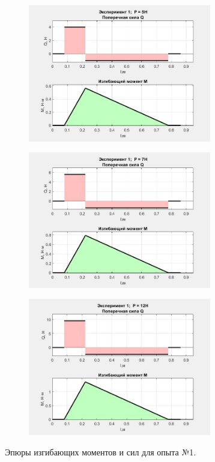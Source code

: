 \documentclass[12pt, a4paper]{article}
\begin{document}
\begin{figure}[h!]
\begin{subfigure}{0.4\textwidth}
        \end{subfigure}
        \hspace{1.2cm}
        \begin{subfigure}{0.4\textwidth}
            \centering
            \includegraphics[width = 8cm]{r_1_5.jpg}
        \end{subfigure}
        \vspace{0cm}
        \hspace{-0.5cm}
        \begin{subfigure}{0.4\textwidth}
            \centering
            \includegraphics[width = 8cm]{r_1_7.jpg}
        \end{subfigure}
        \hspace{1.2cm}
        \begin{subfigure}{0.4\textwidth}
            \centering
            \includegraphics[width = 8cm]{r_1_12.jpg}
        \end{subfigure}
        \caption{\centering Эпюры изгибающих моментов и сил для опыта №1.}
        \label{fig2}
    \end{figure}
    
\end{document}
